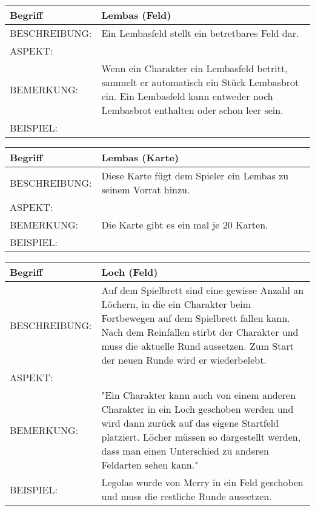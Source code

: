 \documentclass{uulm-assignment}
\begin{document}
	     \begin{tabularx}{\textwidth}{|l|X |} \hline
	        \textbf{Begriff} & \textbf{Lembas (Feld)} \\
	        \hline
	        BESCHREIBUNG: & Ein Lembasfeld stellt ein betretbares Feld dar. \\
	        \hline
	        ASPEKT: &
	        \\
	        \hline
	        BEMERKUNG: &  Wenn ein Charakter ein Lembasfeld betritt, sammelt er automatisch ein Stück Lembasbrot ein. Ein Lembasfeld kann entweder noch Lembasbrot enthalten oder schon leer sein.\\
	        \hline
	        BEISPIEL: & \\
	        \hline
	    \end{tabularx}

	     \begin{tabularx}{\textwidth}{|l|X |} \hline
	        \textbf{Begriff} & \textbf{Lembas (Karte)} \\
	        \hline
	        BESCHREIBUNG: & Diese Karte fügt dem Spieler ein Lembas zu seinem Vorrat hinzu. \\
	        \hline
	        ASPEKT: &
	        \\
	        \hline
	        BEMERKUNG: & Die Karte gibt es ein mal je 20 Karten. \\
	        \hline
	        BEISPIEL: & \\
	        \hline
	    \end{tabularx}

	     \begin{tabularx}{\textwidth}{|l|X |} \hline
	        \textbf{Begriff} & \textbf{Loch (Feld)} \\
	        \hline
	        BESCHREIBUNG: & Auf dem Spielbrett sind eine gewisse Anzahl an Löchern, in die ein Charakter beim Fortbewegen auf dem Spielbrett fallen kann. Nach dem Reinfallen stirbt der Charakter und muss die aktuelle Rund aussetzen.  Zum Start der neuen Runde wird er wiederbelebt. \\
	        \hline
	        ASPEKT: &
	        \\
	        \hline
	        BEMERKUNG: & "Ein Charakter kann auch von einem anderen Charakter in ein Loch geschoben werden und wird dann zurück auf das eigene Startfeld platziert.
	        Löcher müssen so dargestellt werden, dass man einen Unterschied zu anderen Feldarten sehen kann."\\
	        \hline
	        BEISPIEL: & Legolas wurde von Merry in ein Feld geschoben und muss die restliche Runde aussetzen. \\
	        \hline
	    \end{tabularx}
\end{document}
